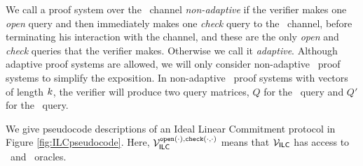 We call a proof system over the \ILC\ channel \emph{non-adaptive} if the verifier makes one \emph{open} query and then immediately makes one \emph{check} query to the \ILC\ channel, before terminating his interaction with the channel, and these are the only \emph{open} and \emph{check} queries that the verifier makes. Otherwise we call it \emph{adaptive}. Although adaptive proof systems are allowed, we will only consider non-adaptive \ILC\ proof systems to simplify the exposition. In non-adaptive \ILC\ proof systems with vectors of length $k$, the verifier will produce two query matrices, $Q$ for the \ILCopen\ query and $Q'$ for the \ILCcheck\ query. 

We give pseudocode descriptions of an Ideal Linear Commitment protocol in Figure \ref{fig:ILCpseudocode}. Here, $\mathcal{V}_{\mathsf{ILC}}^{\texttt{open}(\cdot),\texttt{check}(\cdot,\cdot)}$ means that $\mathcal{V}_{\mathsf{ILC}}$ has access to \ILCopen\ and \ILCcheck\ oracles.

